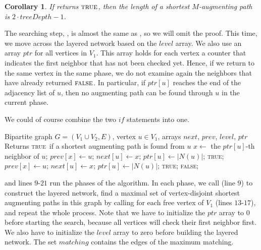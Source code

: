 \documentclass[12pt]{report}
\newtheorem{ccor}[base]{Corollary}
\numberwithin{algorithm}{chapter}
\newcommand{\True}{\textsc{true}}
\newcommand{\False}{\textsc{false}}
\begin{document}
	\begin{ccor}
		If  returns $\True$, then the length of a shortest $M$-augmenting path is $2 \cdot \mathit{treeDepth} - 1$.
	\end{ccor}

	The searching step, , is almost the same as , so we will omit the proof. This time, we move across the layered network based on the $\mathit{level}$ array. We also use an array $\mathit{ptr}$ for all vertices in $V_{1}$. This array holds for each vertex a counter that indicates the first neighbor that has not been checked yet. Hence, if we return to the same vertex in the same phase, we do not examine again the neighbors that have already returned $\False$. In particular, if $\mathit{ptr}[u]$ reaches the end of the adjacency list of $u$, then no augmenting path can be found through $u$ in the current phase. 

	We could of course combine the two $\mathit{if}$ statements into one.

	\begin{algorithm}[H]
	\caption{DFS Phase of Hopcroft-Karp}
	\label{DfsHK}
	\begin{algorithmic}[1]
	\Require Bipartite graph $G=(V_1 \cup V_2,E)$, vertex $u \in V_1$, arrays $\mathit{next}$, $\mathit{prev}$, $\mathit{level}$, $\mathit{ptr}$
	\Ensure Returns \True\ if a shortest augmenting path is found from $u$
			\State $x \gets$ the $\mathit{ptr}[u]$-th neighbor of $u$;
				\State $\mathit{prev}[x] \gets u$;
				\State $\mathit{next}[u] \gets x$;
				\State $\mathit{ptr}[u] \gets |N(u)|$;
				\State \Return \True;
			\EndIf
				\State $\mathit{prev}[x] \gets u$;
				\State $\mathit{next}[u] \gets x$;
				\State $\mathit{ptr}[u] \gets |N(u)|$;
				\State \Return \True;
			\EndIf
		\EndFor
		\State \Return \False;
	\EndFunction
	\end{algorithmic}
	\end{algorithm}

	 and lines $9$-$21$ run the phases of the algorithm. In each phase, we call  (line $9$) to construct the layered network, find a maximal set of vertex-disjoint shortest augmenting paths in this graph by calling  for each free vertex of $V_{1}$ (lines $13$-$17$), and repeat the whole process. Note that we have to initialize the $\mathit{ptr}$ array to $0$ before starting the search, because all vertices will check their first neighbor first. We also have to initialize the $\mathit{level}$ array to zero before building the layered network. The set $\mathit{matching}$ contains the edges of the maximum matching.
\end{document}
